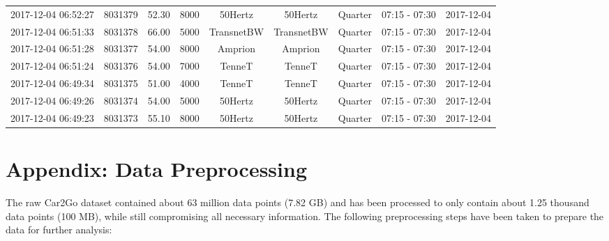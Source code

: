 \documentclass[a4paper, 12pt]{article}
\begin{document}
{\begin{table}
\begin{tabular}{c|cccccccc}
2017-12-04 06:52:27 & 8031379 & 52.30 & 8000 & 50Hertz & 50Hertz & Quarter & 07:15 - 07:30 & 2017-12-04\\
2017-12-04 06:51:33 & 8031378 & 66.00 & 5000 & TransnetBW & TransnetBW & Quarter & 07:15 - 07:30 & 2017-12-04\\
2017-12-04 06:51:28 & 8031377 & 54.00 & 8000 & Amprion & Amprion & Quarter & 07:15 - 07:30 & 2017-12-04\\
2017-12-04 06:51:24 & 8031376 & 54.00 & 7000 & TenneT & TenneT & Quarter & 07:15 - 07:30 & 2017-12-04\\
2017-12-04 06:49:34 & 8031375 & 51.00 & 4000 & TenneT & TenneT & Quarter & 07:15 - 07:30 & 2017-12-04\\
2017-12-04 06:49:26 & 8031374 & 54.00 & 5000 & 50Hertz & 50Hertz & Quarter & 07:15 - 07:30 & 2017-12-04\\
2017-12-04 06:49:23 & 8031373 & 55.10 & 8000 & 50Hertz & 50Hertz & Quarter & 07:15 - 07:30 & 2017-12-04\\
\hline
\hline
\end{tabular}
\end{table}
}
\clearpage

\section{Appendix: Data Preprocessing \label{app-data-processing}}
\label{sec:orgba756ff}
The raw Car2Go dataset contained about 63 million data points (7.82 GB) and has
been processed to only contain about 1.25 thousand data points (100 MB), while
still compromising all necessary information. The following preprocessing steps
have been taken to prepare the data for further analysis:
\end{document}

